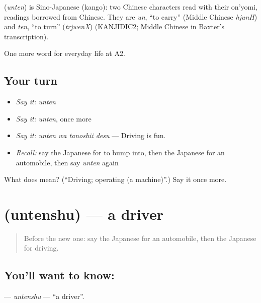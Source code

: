 \begin{cousinweb}
\textbf{} (\emph{unten}) is Sino-Japanese (kango): two Chinese characters read with their on'yomi, readings borrowed from Chinese. They are \emph{un}, \textquotedblleft{}to carry\textquotedblright{} (Middle Chinese \emph{hjunH}) and \emph{ten}, \textquotedblleft{}to turn\textquotedblright{} (\emph{trjwenX}) (KANJIDIC2; Middle Chinese in Baxter's transcription).
\end{cousinweb}

\begin{grammarlens}[title={What you've built}]
One more word for everyday life at A2.
\end{grammarlens}

\subsection*{Your turn}
\begin{itemize}
\raggedright
  \item \emph{Say it:} \emph{unten}
  \item \emph{Say it:} \emph{unten}, once more
  \item \emph{Say it:} \emph{unten wa tanoshii desu} — Driving is fun.
  \item \emph{Recall:} say the Japanese for to bump into, then the Japanese for an automobile, then say \emph{unten} again
\end{itemize}

\begin{tcolorbox}[breakable,colback=teal!4,colframe=teal!35!black,title={Before you move on}]
What does  mean? (\textquotedblleft{}Driving; operating (a machine)\textquotedblright{}.) Say it once more.
\end{tcolorbox}
\section[\texorpdfstring{\ja{うんてんしゅ} (untenshu)}{うんてんしゅ (untenshu)}]{ (untenshu) — a driver}

\label{lesson:JA-C202-untenshu}



\begin{quote}
Before the new one: say the Japanese for an automobile, then the Japanese for driving.
\end{quote}

\subsection*{You'll want to know: }
\textbf{} — \emph{untenshu} — \textquotedblleft{}a driver\textquotedblright{}.

